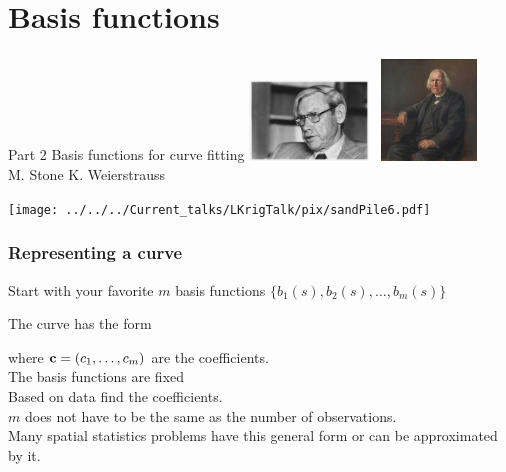 \documentclass[english]{beamer} %
\def\Mycomment#1{{\color{midnightblue}{\it  {\large #1}}}}
\def\Myspace{{\vspace*{.125in}}}
\begin{document}
 

\section{Basis functions}
\begin{frame} %
\frametitle{}
{\huge  Part 2 Basis functions for curve fitting}
\Myspace
\hspace*{.25in} \includegraphics[width=1.25in]{pix/stone.jpg} 
\ 
\includegraphics[width=1in]{pix/weierstrauss.jpeg} \\
\hspace*{.35in} M. Stone \hspace{.6in}  K. Weierstrauss \\
\Myspace
\Myspace

\texttt{[image: ../../../Current\_talks/LKrigTalk/pix/sandPile6.pdf]}

\end{frame}   %

\begin{frame} %
\frametitle{Representing a curve}
Start with your favorite 
$m$ basis functions $\{b_1(s), b_2(s), \ldots, b_m(s)\}$

The curve  has the form 

\Mycomment{
\[{g}(s)=\sum_{k=1}^{m}b_{k}(s){c}_{k}\]}
where
${\mathbf{c}}=({c}_1, \ldots, {c}_m)$ are the coefficients.
\\
\Myspace
\bdot The basis functions are fixed \\
\bdot Based on data  find the coefficients.  \\
\bdot $m$ does not have to be the same as the number of observations. 
\\
\Myspace
Many spatial statistics problems have this general form or can be approximated by it.

\end{frame} %
\end{document}
